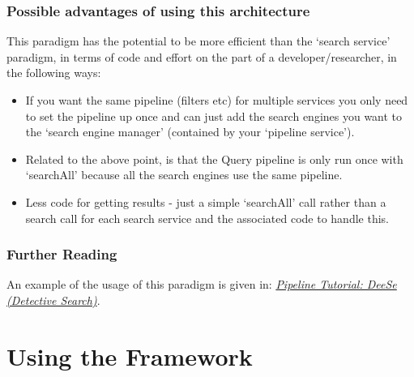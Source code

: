 \documentclass[letterpaper,10pt,english]{sphinxmanual}
\begin{document}
\subsection{Possible advantages of using this architecture}
\label{pipeline:possible-advantages-of-using-this-architecture}
This paradigm has the potential to be more efficient than the ‘search service’ paradigm, in terms of code and effort on the part of a developer/researcher, in the following ways:
\begin{itemize}
\item {} 
If you want the same pipeline (filters etc) for multiple services you only need to set the pipeline up once and can just add the search engines you want to the `search engine manager' (contained by your `pipeline service').

\item {} 
Related to the above point, is that the Query pipeline is only run once with `searchAll' because all the search engines use the same pipeline.

\item {} 
Less code for getting results - just a simple `searchAll' call rather than a search call for each search service and the associated code to handle this.

\end{itemize}


\subsection{Further Reading}
\label{pipeline:further-reading}
An example of the usage of this paradigm is given in: {\hyperref[pipeline-tutorial:pipeline-puppyir-tutorial]{\emph{Pipeline Tutorial: DeeSe (Detective Search)}}}.


\chapter{Using the Framework}
\label{index:using-the-framework}
\end{document}

